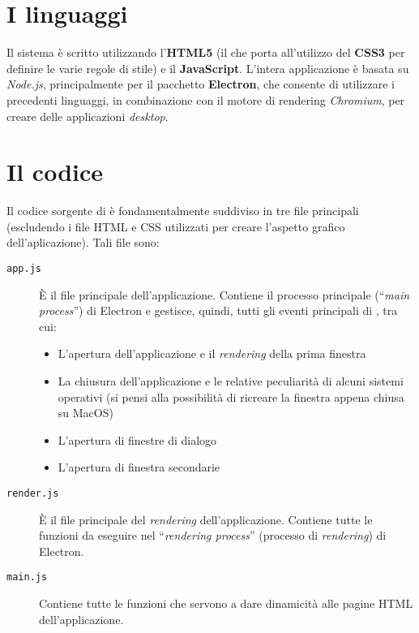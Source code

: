 \section{I linguaggi}
Il sistema \ProjectTitle{} è scritto utilizzando l'\textbf{HTML5} (il che porta all'utilizzo del \textbf{CSS3} per definire le varie regole di stile) e il \textbf{JavaScript}. L'intera applicazione è basata su \emph{Node.js}, principalmente per il pacchetto \textbf{Electron}, che consente di utilizzare i precedenti linguaggi, in combinazione con il motore di rendering \emph{Chromium}, per creare delle applicazioni \textit{desktop}.

\section{Il codice}
Il codice sorgente di \ProjectTitle{} è fondamentalmente suddiviso in tre file principali (escludendo i file HTML e CSS utilizzati per creare l'aspetto grafico dell'aplicazione). Tali file sono:
\begin{description}
	\item[\texttt{app.js}] È il file principale dell'applicazione. Contiene il processo principale (``\emph{main process}'') di Electron e gestisce, quindi, tutti gli eventi principali di \ProjectTitle{}, tra cui:
	\begin{itemize}
		\item L'apertura dell'applicazione e il \emph{rendering} della prima finestra
		\item La chiusura dell'applicazione e le relative peculiarità di alcuni sistemi operativi (si pensi alla possibilità di ricreare la finestra appena chiusa su MacOS)
		\item L'apertura di finestre di dialogo
		\item L'apertura di finestra secondarie
	\end{itemize} 
	\item[\texttt{render.js}] È il file principale del \emph{rendering} dell'applicazione. Contiene tutte le funzioni da eseguire nel ``\emph{rendering process}'' (processo di \emph{rendering}) di Electron.
	\item[\texttt{main.js}] Contiene tutte le funzioni che servono a dare dinamicità alle pagine HTML dell'applicazione. 
\end{description}